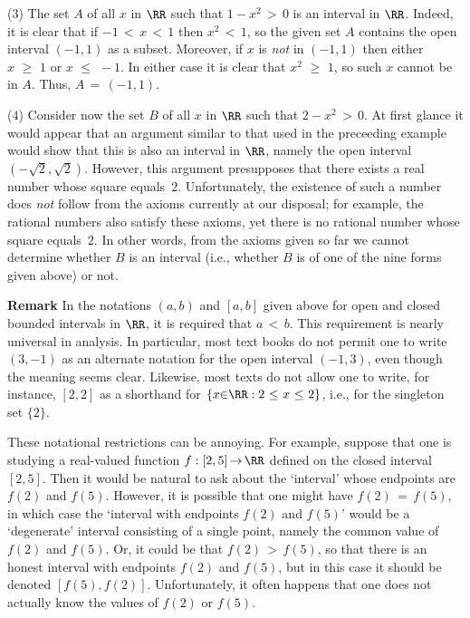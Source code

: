 \V

        (3) The set $A$ of all $x$ in ${\RR}$ such that $1-x^{2}\,>\,0$ is an interval in ${\RR}$.
    Indeed, it is clear that if $-1\,<\,x\,<\,1$ then $x^{2}\,<\,1$, so the given set $A$ contains the open interval $(-1,1)$ as a subset.
    Moreover, if $x$ is {\em not} in $(-1,1)$ then either $x\,\,{\geq}\,\,1$ or $x\,\,{\leq}\,\,-1$.
    In either case it is clear that $x^{2}\,\,{\geq}\,\,1$, so such $x$ cannot be in $A$.
    Thus, $A \,=\, (-1,1)$.

\V

        (4) Consider now the set $B$ of all $x$ in ${\RR}$ such that $2-x^{2}\,>\,0$.
    At first glance it would appear that an argument similar to that used in the preceeding example would show that this is also an interval in ${\RR}$, namely the open interval $(-\sqrt{2},\sqrt{2})$.
     However, this argument presupposes that there exists a real number whose square equals~$2$.
    Unfortunately, the existence of such a number does {\em not} follow from the axioms currently at our disposal;
    for example, the rational numbers also satisfy these axioms, yet there is  no rational number whose square equals~$2$.
    In other words, from the axioms given so far we cannot determine whether $B$ is an interval (i.e., whether $B$ is of one of the nine forms given above) or not.


\V
\V

        {\bf Remark} In the notations $(a,b)$ and $[a,b]$ given above for open and closed bounded intervals in ${\RR}$, it is required that $a\,<\,b$.
    This requirement is nearly universal in analysis. In particular, most text books do not permit one to write
    $(3,-1)$ as an alternate notation for the open interval $(-1,3)$, even though the meaning seems clear.
    Likewise, most texts do not allow one to write, for instance, $[2,2]$ as a shorthand for $\{x{\in}{\RR}: 2\,\,{\leq}\,\,x\,\,{\leq}\,\,2\}$,
    i.e., for the singleton set $\{2\}$.

        These notational restrictions can be annoying. For example, suppose that one is studying a real-valued function $f:[2,5] \,{\rightarrow}\, {\RR}$
    defined on the closed interval $[2,5]$.
    Then it would be natural to ask about the `interval' whose endpoints are $f(2)$ and $f(5)$.
    However, it is possible that one might have $f(2) \,=\, f(5)$, in which case the `interval with endpoints $f(2)$ and $f(5)$' would be a `degenerate' interval consisting of a single point, namely the common value of $f(2)$ and $f(5)$.
    Or, it could be that $f(2)\,>\,f(5)$, so that there is an honest interval with endpoints $f(2)$ and $f(5)$, but in this case it should be denoted $[f(5),f(2)]$.
    Unfortunately, it often happens that one does not actually know the values of $f(2)$ or $f(5)$.

